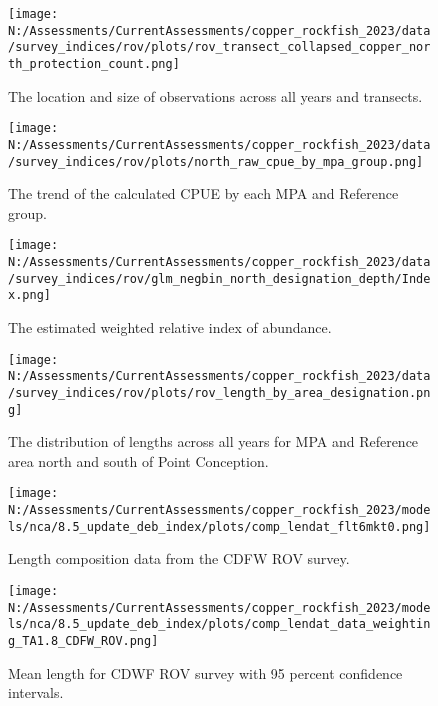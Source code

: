 \documentclass[11pt,
  english,
  letterpaper,
]{article}
\begin{document}
\begin{figure}
\centering
\texttt{[image: N:/Assessments/CurrentAssessments/copper\_rockfish\_2023/data/survey\_indices/rov/plots/rov\_transect\_collapsed\_copper\_north\_protection\_count.png]}
\caption{The location and size of observations across all years and transects.\label{fig:rov-obs-loc}}
\end{figure}

\begin{figure}
\centering
\texttt{[image: N:/Assessments/CurrentAssessments/copper\_rockfish\_2023/data/survey\_indices/rov/plots/north\_raw\_cpue\_by\_mpa\_group.png]}
\caption{The trend of the calculated CPUE by each MPA and Reference group.\label{fig:rov-raw-cpue}}
\end{figure}

\begin{figure}
\centering
\texttt{[image: N:/Assessments/CurrentAssessments/copper\_rockfish\_2023/data/survey\_indices/rov/glm\_negbin\_north\_designation\_depth/Index.png]}
\caption{The estimated weighted relative index of abundance.\label{fig:rov-index-main}}
\end{figure}

\begin{figure}
\centering
\texttt{[image: N:/Assessments/CurrentAssessments/copper\_rockfish\_2023/data/survey\_indices/rov/plots/rov\_length\_by\_area\_designation.png]}
\caption{The distribution of lengths across all years for MPA and Reference area north and south of Point Conception.\label{fig:rov-len}}
\end{figure}

\begin{figure}
\centering
\texttt{[image: N:/Assessments/CurrentAssessments/copper\_rockfish\_2023/models/nca/8.5\_update\_deb\_index/plots/comp\_lendat\_flt6mkt0.png]}
\caption{Length composition data from the CDFW ROV survey.\label{fig:rov-len-data}}
\end{figure}

\begin{figure}
\centering
\texttt{[image: N:/Assessments/CurrentAssessments/copper\_rockfish\_2023/models/nca/8.5\_update\_deb\_index/plots/comp\_lendat\_data\_weighting\_TA1.8\_CDFW\_ROV.png]}
\caption{Mean length for CDWF ROV survey with 95 percent confidence intervals.\label{fig:mean-rov-len-data}}
\end{figure}
\end{document}
